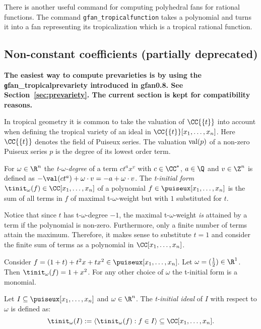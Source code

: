 There is another useful command for computing polyhedral fans for
rational functions. The command \texttt{gfan\_tropicalfunction} takes a
polynomial and turns it into a fan representing its tropicalization
which is a tropical rational function.

\subsection{Non-constant coefficients (partially deprecated)}
\label{sec:non-constant}
{\bf The easiest way to compute prevarieties is by using the {\texttt gfan\_tropicalprevariety} introduced in gfan0.8. See Section~\ref{sec:prevariety}. The current section is kept for compatibility reasons.}

In tropical geometry it is common to take the valuation of
$\CC\{\{t\}\}$ into account when defining the tropical variety of
an ideal in $\CC\{\{t\}\}[x_1,\dots,x_n]$.  Here $\CC\{\{t\}\}$ denotes the field of
Puiseux series. The valuation $\textup{val}(p)$ of a non-zero Puiseux
series $p$ is the degree of its lowest order term.


\begin{definition}
\label{def:tomegadegree}
For $\omega\in\R^n$ the \emph{t-$\omega$-degree} of a term $ct^ax^v$
with $c\in\CC^*$, $a\in \Q$ and $v\in\Z^n$ is defined as
$-\val(ct^a)+\omega\cdot v=-a+\omega\cdot v$.  The \emph{t-initial
form} $\tinit_\omega(f)\in\CC[x_1,\dots,x_n]$ of a polynomial
$f\in\puiseux[x_1,\dots,x_n]$ is the sum of all terms in $f$ of maximal
t-$\omega$-weight but with $1$ substituted for $t$.
\end{definition}
\begin{remark}
Notice that since $t$ has t-$\omega$-degree $-1$, the maximal
t-$\omega$-weight \emph{is} attained by a term if the polynomial is
non-zero. Furthermore, only a finite number of terms attain the
maximum. Therefore, it makes sense to substitute $t=1$ and consider
the finite sum of terms as a polynomial in $\CC[x_1,\dots,x_n]$.
\end{remark}
\begin{example}
Consider $f=(1+t)+t^2x+tx^2\in\puiseux[x_1,\dots,x_n]$. Let $\omega=({1\over
2})\in\R^1$. Then $\tinit_\omega(f)=1+x^2$. For any
other choice of $\omega$ the t-initial form is a monomial.
\end{example}
\begin{definition}
Let $I\subseteq \puiseux[x_1,\dots,x_n]$ and $\omega\in\R^n$. The \emph{t-initial ideal} of $I$ with respect to $\omega$ is defined as:
$$\tinit_\omega(I):=\langle \tinit_\omega(f):f\in I\rangle\subseteq\CC[x_1,\dots,x_n].$$
\end{definition}

